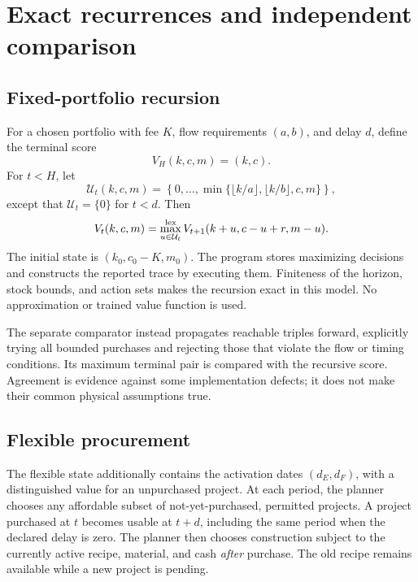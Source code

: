 \documentclass[11pt,letterpaper]{article}
\newcommand{\1}{\mathbf 1}
\theoremstyle{remark}\newtheorem{remark}{Remark}[section]
\begin{document}
\section{Exact recurrences and independent comparison}\label{app:recurrences}
\subsection{Fixed-portfolio recursion}
For a chosen portfolio with fee $K$, flow requirements $(a,b)$, and delay $d$, define the terminal score
\begin{equation}
 V_H(k,c,m)=(k,c).
\end{equation}
For $t<H$, let
\begin{equation}
 \mathcal U_t(k,c,m)=\left\{0,\ldots,
 \min\{\lfloor k/a\rfloor,\lfloor k/b\rfloor,c,m\}\right\},
\end{equation}
except that $\mathcal U_t=\{0\}$ for $t<d$. Then
\begin{equation}
 V_t(k,c,m)=\max_{u\in\mathcal U_t}^{\rm lex}
 V_{t+1}(k+u,c-u+r,m-u).
\end{equation}
The initial state is $(k_0,c_0-K,m_0)$. The program stores maximizing decisions and constructs the reported trace by executing them. Finiteness of the horizon, stock bounds, and action sets makes the recursion exact in this model. No approximation or trained value function is used.

The separate comparator instead propagates reachable triples forward, explicitly trying all bounded purchases and rejecting those that violate the flow or timing conditions. Its maximum terminal pair is compared with the recursive score. Agreement is evidence against some implementation defects; it does not make their common physical assumptions true.

\subsection{Flexible procurement}
The flexible state additionally contains the activation dates $(d_E,d_F)$, with a distinguished value for an unpurchased project. At each period, the planner chooses any affordable subset of not-yet-purchased, permitted projects. A project purchased at $t$ becomes usable at $t+d$, including the same period when the declared delay is zero. The planner then chooses construction subject to the currently active recipe, material, and cash \emph{after} purchase. The old recipe remains available while a new project is pending.
\end{document}
